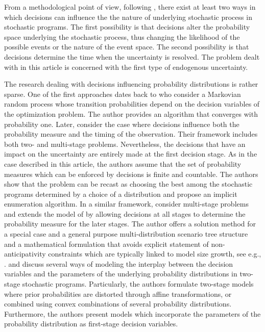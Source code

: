 \documentclass[12pt]{article}
\theoremstyle{thmstylethree}%
\begin{document}
From a methodological point of view, following \cite{GoeG06}, there exist at least two ways in which decisions can influence the the nature of underlying stochastic process in stochastic programs.
The first possibility is that decisions alter the probability space underlying the stochastic process, 
thus changing the likelihood of the possible events or the nature of the event space. 
The second possibility is that decisions determine the time when the uncertainty is resolved. 
The problem dealt with in this article is concerned with the first type of endogenous uncertainty.

The research dealing with decisions influencing probability distributions is rather sparse. 
One of the first approaches dates back to \cite{Pfl90} who consider a Markovian random process whose transition probabilities depend on the decision variables of the optimization problem. The author provides an algorithm that converges with probability one. 
Later, \cite{JonWW98} consider the case where decisions influence both the probability measure and the timing of the observation. 
Their framework includes both two- and multi-stage problems. Nevertheless, the decisions that have an impact on the uncertainty are entirely made at the first decision stage. As in the case described in this article, the authors assume that the set of probability measures which can be enforced by decisions is finite and countable. The authors show that the problem can be recast as choosing the best among the stochastic programs determined by a choice of a distribution and 
propose an implicit enumeration algorithm.
In a similar framework, \cite{Pan21} consider multi-stage problems and extends the model of \cite{JonWW98} by allowing decisions at all stages to determine the probability measure for the later stages. The author offers a solution method for a special case and a general purpose multi-distribution scenario tree structure and a mathematical formulation that avoids explicit statement of non-anticipativity constraints which are typically linked to model size growth, see e.g., \cite{ApaG16,HooM16,MooM18}. 
\cite{Hel16} and \cite{HelBT18} discuss several ways of modeling the interplay between the decision variables and the parameters of the underlying probability distributions in two-stage stochastic programs. Particularly, the authors formulate two-stage models where prior probabilities are distorted
through affine transformations, or combined using convex combinations of several probability distributions.
Furthermore, the authors present models which incorporate the parameters of the probability distribution as
first-stage decision variables.
\end{document}
